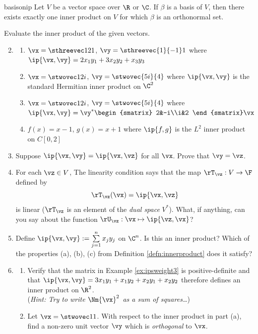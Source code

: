 \begin{lemm}{}{basisonip}
Let $V$ be a vector space over $\R$ or $\C$. If $\beta$ is a basis of $V$, then there exists exactly one inner product on $V$ for which $\beta$ is an orthonormal set.
\end{lemm}



\begin{exercises}
\exstart Evaluate the inner product of the given vectors.
\begin{enumerate}\setcounter{enumi}{1}
  \item[]\begin{enumerate}
    \item $\vx=\sthreevec 121$, $\vy=\sthreevec{1}{-1}1$ where $\ip{\vx,\vy}=2x_1y_1+3x_2y_2+x_3y_3$
    \item $\vx=\stwovec 1{2i}$, $\vy=\stwovec{5i}{4}$ where $\ip{\vx,\vy}$ is the standard Hermitian inner product on $\C^2$
    \item $\vx=\stwovec 1{2i}$, $\vy=\stwovec{5i}{4}$ where $\ip{\vx,\vy}=\vy^*\begin{smatrix}
    2&-i\\i&2
    \end{smatrix}\vx$
    \item $f(x)=x-1$, $g(x)=x+1$ where $\ip{f,g}$ is the $L^2$ inner product on $C[0,2]$
  \end{enumerate}
  
  \item Suppose $\ip{\vx,\vy}=\ip{\vx,\vz}$ for all $\vx$. Prove that $\vy=\vz$.
  
  \item For each $\vz\in V$, The linearity condition says that the map $\rT_\vz:V\to\F$ defined by
  \[\rT_\vz(\vx)=\ip{\vx,\vz}\]
  is linear ($\rT_\vz$ is an element of the \emph{dual space} $V^*$). What, if anything, can you say about the function $\rU_\vz:\vx\mapsto\ip{\vz,\vx}$?
  
  \item Define $\ip{\vx,\vy}:=\sum\limits_{j=1}^nx_jy_j$ on $\C^n$. Is this an inner product? Which of the properties (a), (b), (c) from Definition \ref{defn:innerproduct} does it satisfy?
  
  \item\begin{enumerate}
    \item Verify that the matrix in Example \ref{ex:ipsweight3} is positive-definite and that  $\ip{\vx,\vy}=3x_1y_1+x_1y_2+x_2y_1+x_2y_2$ therefore defines an inner product on $\R^2$.\\
  (\emph{Hint: Try to write $\Nm{\vx}^2$ as a sum of squares\ldots})
  	\item Let $\vx=\stwovec 11$. With respect to the inner product in part (a), find a non-zero unit vector $\vy$ which is \emph{orthogonal} to $\vx$.
  \end{enumerate}
  \goodbreak
  

\end{enumerate}
\end{exercises}

